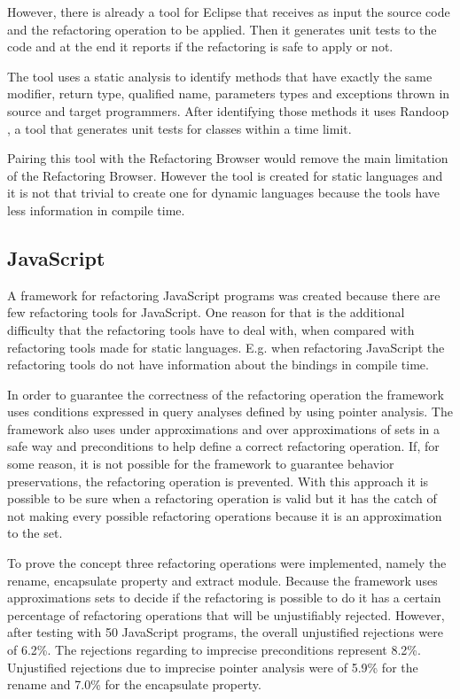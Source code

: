 %
However, there is already a tool \cite{soares2010making} for Eclipse that receives as input the source code and the refactoring operation to be applied. 
Then it generates unit tests to the code and at the end it reports if the refactoring is safe to apply or not.

The tool uses a static analysis to identify methods that have exactly the same modifier, return type, qualified name, parameters types and exceptions thrown in source and target programmers.
After identifying those methods it uses Randoop \cite{pacheco2007feedback}, a tool that generates unit tests for classes within a time limit.

Pairing this tool with the Refactoring Browser would remove the main limitation of the Refactoring Browser.
However the tool is created for static languages and it is not that trivial to create one for dynamic languages because the tools have less information in compile time.

\subsection{JavaScript}

A framework \cite{feldthaus2011tool} for refactoring JavaScript programs was created because there are few refactoring tools for JavaScript. 
One reason for that is the additional difficulty that the refactoring tools have to deal with, when compared with refactoring tools made for static languages. 
E.g. when refactoring JavaScript the refactoring tools do not have information about the bindings in compile time.


In order to guarantee the correctness of the refactoring operation the framework uses conditions expressed in query analyses defined by using pointer analysis.
The framework also uses under approximations and over approximations of sets in a safe way  and preconditions to help define a correct refactoring operation.
If, for some reason, it is not possible for the framework to guarantee behavior preservations, the refactoring operation is prevented.
With this approach it is possible to be sure when a refactoring operation is valid but it has the catch of not making every possible refactoring operations because it is an approximation to the set.


To prove the concept three refactoring operations were implemented, namely the rename, encapsulate property and extract module.
Because the framework uses approximations sets to decide if the refactoring is possible to do it has a certain percentage of refactoring operations that will be unjustifiably rejected.
However, after testing with 50 JavaScript programs, the overall unjustified rejections were of 6.2\%. 
The rejections regarding to imprecise preconditions represent 8.2\%.
Unjustified rejections due to imprecise pointer analysis were of 5.9\% for the rename and 7.0\% for the encapsulate property. 


